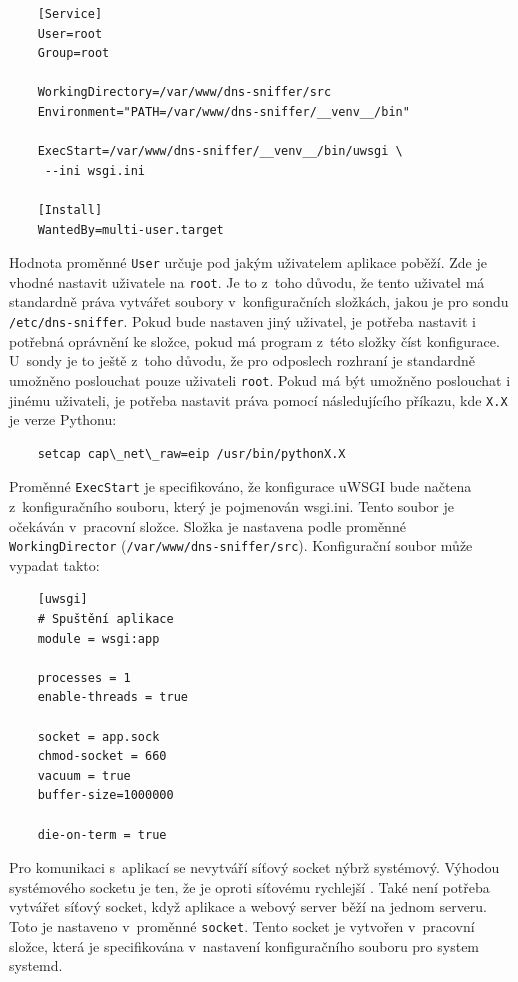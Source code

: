 \documentclass[thesis=M,czech]{src/FITthesis}[2019/12/23]
\begin{document}
\begin{enumerate}
\begin{verbatim}
	[Service]
	User=root
	Group=root

	WorkingDirectory=/var/www/dns-sniffer/src
	Environment="PATH=/var/www/dns-sniffer/__venv__/bin"

	ExecStart=/var/www/dns-sniffer/__venv__/bin/uwsgi \
	 --ini wsgi.ini 

	[Install]
	WantedBy=multi-user.target
	\end{verbatim}
	Hodnota proměnné \texttt{User} určuje pod jakým uživatelem aplikace poběží. Zde je vhodné nastavit uživatele na \texttt{root}. Je to z~toho důvodu, že tento uživatel má standardně práva vytvářet soubory v~konfiguračních složkách, jakou je pro sondu \texttt{/etc/dns-sniffer}. Pokud bude nastaven jiný uživatel, je potřeba nastavit i potřebná oprávnění ke složce, pokud má program z~této složky číst konfigurace. U~sondy je to ještě z~toho důvodu, že pro odposlech rozhraní je standardně umožněno poslouchat pouze uživateli \texttt{root}. Pokud má být umožněno poslouchat i jinému uživateli, je potřeba nastavit práva pomocí následujícího příkazu, kde \texttt{X.X} je verze Pythonu:
	\begin{verbatim}
	setcap cap\_net\_raw=eip /usr/bin/pythonX.X
	\end{verbatim}
	
	Proměnné \texttt{ExecStart} je specifikováno, že konfigurace uWSGI bude \linebreak načtena z~konfiguračního souboru, který je pojmenován wsgi.ini. Tento soubor je očekáván v~pracovní složce. Složka je nastavena podle proměnné \texttt{WorkingDirector} (\texttt{/var/www/dns-sniffer/src}). Konfigurační soubor může vypadat takto:  
	\begin{verbatim}
	[uwsgi]
	# Spuštění aplikace
	module = wsgi:app

	processes = 1
	enable-threads = true

	socket = app.sock
	chmod-socket = 660 
	vacuum = true
	buffer-size=1000000

	die-on-term = true	

	\end{verbatim}
	Pro komunikaci s~aplikací se nevytváří síťový socket nýbrž systémový. Výhodou systémového socketu je ten, že je oproti síťovému rychlejší . Také není potřeba vytvářet síťový socket, když aplikace a webový server běží na jednom serveru. Toto je nastaveno v~proměnné \texttt{socket}. Tento socket je vytvořen v~pracovní složce, která je specifikována v~nastavení konfiguračního souboru pro system systemd. \cite{unix-network-socket}
	

\end{enumerate}
\end{document}

